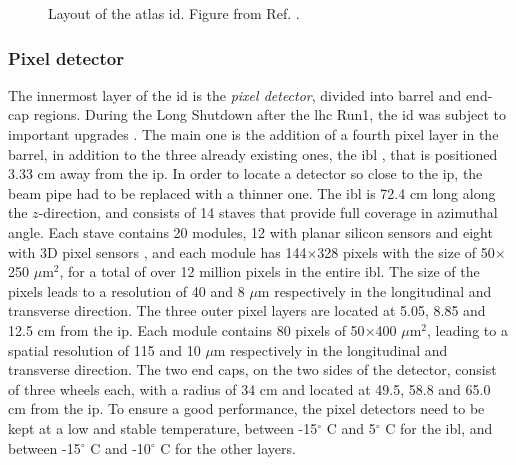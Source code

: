 \begin{figure}[ht]
\centering
{}
\caption{Layout of the \gls{atlas} \gls{id}. Figure from Ref. \cite{Potamianos:2016ptf}.}
\label{fig:atlas:id}
\end{figure}


\subsubsection*{Pixel detector}
\label{sec:atlas:pixel}
The innermost layer of the \gls{id} is the \textit{pixel detector}, divided into barrel and end-cap regions. 
During the Long Shutdown after the \gls{lhc} Run1, the \gls{id} was subject to important upgrades \cite{Potamianos:2016ptf}. 
The main one is the addition of a fourth pixel layer in the barrel, in addition to the three already existing ones, 
the \gls{ibl} \cite{Capeans:1291633}, that is positioned 3.33 cm away from the \gls{ip}. 
In order to locate a detector so close to the \gls{ip}, the beam pipe had to be replaced with a thinner one. 
The \gls{ibl} is 72.4 cm long along the $z$-direction, and consists of 14 staves that provide full coverage in azimuthal angle. Each stave contains 20 modules, 12 with planar silicon sensors and eight with 3D pixel sensors \cite{1748-0221-7-11-P11010}, and each module has 144$\times$328 pixels with the size of 50$\times$250 $\mu$m$^2$, for a total of over 12 million pixels in the entire \gls{ibl}. The size of the pixels leads to a resolution of 40 and 8 $\mu$m respectively in the longitudinal and transverse direction. 
The three outer pixel layers are located at 5.05, 8.85 and 12.5 cm from the \gls{ip}. 
Each module contains 80 pixels of 50$\times$400 $\mu$m$^2$, leading to a spatial resolution of 115 and 10 $\mu$m respectively in the longitudinal and transverse direction. 
The two end caps, on the two sides of the detector, consist of three wheels each, with a radius of 34 cm and located at 49.5, 58.8 and 65.0 cm from the \gls{ip}. 
To ensure a good performance, the pixel detectors need to be kept at a low and stable temperature, 
between -15$^{\circ}$ C and 5$^{\circ}$ C for the \gls{ibl}, and between -15$^{\circ}$ C and -10$^{\circ}$ C for the other layers.

